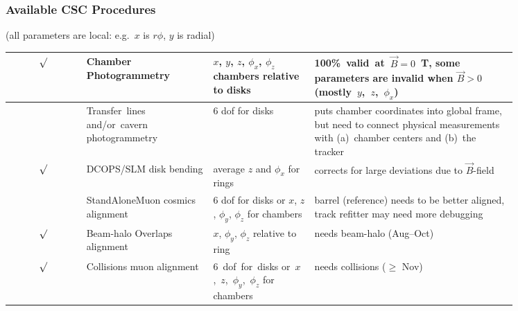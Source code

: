 \documentclass[compress]{beamer}
\begin{document}
\begin{frame}
\frametitle{Available CSC Procedures}
{\scriptsize (all parameters are local: e.g.\ $x$ is $r\phi$, $y$ is radial)}

\renewcommand{\arraystretch}{1.25}

\begin{tabular}{c p{0.25\linewidth} p{0.2\linewidth} p{0.4\linewidth}}
$\surd$ & Chamber \mbox{Photogrammetry} & $x$, $y$, $z$, $\phi_x$, $\phi_z$ chambers relative to disks & \mbox{100\% valid at $\vec{B}=0$~T,} some parameters are invalid when $\vec{B}>0$ \mbox{(mostly $y$, $z$, $\phi_x$)\hspace{-1 cm}} \\\hline
& \mbox{Transfer lines} \mbox{and/or cavern} photogrammetry & 6 dof for disks & puts chamber coordinates into global frame, but need to connect physical measurements with (a)~chamber centers and (b)~the tracker \\\hline
$\surd$ & DCOPS/SLM disk bending & average $z$ and $\phi_x$ for rings & corrects for large deviations due to $\vec{B}$-field \\\hline
& StandAloneMuon cosmics alignment & 6 dof for disks or $x$, $z$, $\phi_y$, $\phi_z$ for chambers & barrel (reference) needs to be better aligned, track refitter may need more debugging \\\hline
$\surd$ & Beam-halo Overlaps alignment & $x$, $\phi_y$, $\phi_z$ relative to ring & needs beam-halo (Aug--Oct) \\\hline
$\surd$ & Collisions muon alignment & \mbox{6 dof for disks} \mbox{or $x$, $z$, $\phi_y$, $\phi_z$} for chambers & needs collisions ($\ge$ Nov) \\
\end{tabular}
\end{frame}
\end{document}
